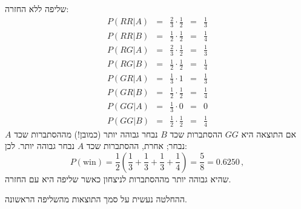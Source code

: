 שליפה ללא החזרה:
\[
\renewcommand*{\arraystretch}{1.5}
\begin{array}{lcccc}
P(RR|A) &=& \frac{2}{3} \cdot \frac{1}{2} &=& \frac{1}{3}\\
P(RR|B) &=& \frac{1}{2} \cdot \frac{1}{2} &=& \frac{1}{4}\\
\hline
P(RG|A) &=& \frac{2}{3} \cdot \frac{1}{2} &=& \frac{1}{3}\\
P(RG|B) &=& \frac{1}{2} \cdot \frac{1}{2} &=& \frac{1}{4}\\
\hline
P(GR|A) &=& \frac{1}{3} \cdot 1 &=& \frac{1}{3}\\
P(GR|B) &=& \frac{1}{2} \cdot \frac{1}{2} &=& \frac{1}{4}\\
\hline
P(GG|A) &=& \frac{1}{3} \cdot 0 &=& 0\\
P(GG|B) &=& \frac{1}{2} \cdot \frac{1}{2} &=& \frac{1}{4}
\end{array}
\]
אם התוצאה היא
$GG$
ההסתברות שכד
$B$
נבחר גבוהה יותר (כמובן!) מההסתברות שכד
$A$
נבחר; אחרת, ההסתברות שכד 
$A$
נבחר גבוהה יותר. לכן:
\[
P(\textrm{win})=\frac{1}{2}\left(\frac{1}{3} + \frac{1}{3}+ \frac{1}{3}+ \frac{1}{4}\right)=\frac{5}{8}=0.6250\,,
\]
שהיא גבוהה יותר מההסתברות לניצחון כאשר שליפה היא עם החזרה.

ההחלטה נעשית על סמך התוצאות מהשליפה הראשונה.

